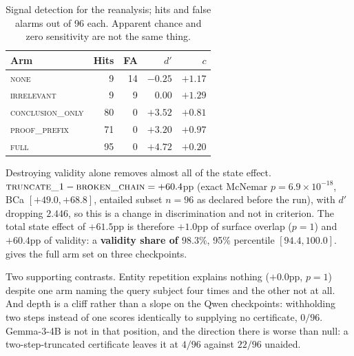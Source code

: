 \documentclass[10pt,twocolumn]{article}
\begin{document}
\begin{table}[tb]
\centering\footnotesize
\caption{Signal detection for the reanalysis; hits and false alarms out of 96
each. Apparent chance and zero
sensitivity are not the same thing.}
\label{tab:sdt}
\begin{tabular}{lrrrr}
\toprule
Arm & Hits & FA & $d'$ & $c$ \\
\midrule
\textsc{none} & 9 & 14 & $-0.25$ & $+1.17$ \\
\textsc{irrelevant}      &  9 &  9 & $\mathbf{0.00}$ & $+1.29$ \\
\textsc{conclusion\_only}& 80 &  0 & $+3.52$ & $+0.81$ \\
\textsc{proof\_prefix}   & 71 &  0 & $+3.20$ & $+0.97$ \\
\textsc{full}            & 95 &  0 & $+4.72$ & $+0.20$ \\
\bottomrule
\end{tabular}
\end{table}

Destroying validity alone removes almost all of the
state effect.
$\textsc{truncate\_1} - \textsc{broken\_chain} = +60.4$pp (exact McNemar
$p = 6.9\times10^{-18}$, BCa $[+49.0, +68.8]$, entailed subset $n = 96$ as
declared before the run), with $d'$ dropping $2.446$, so this is a change in
discrimination and not in criterion. The total state effect of $+61.5$pp is
therefore $+1.0$pp of surface overlap ($p = 1$) and $+60.4$pp of validity: a
\textbf{validity share of $98.3\%$}, 95\% percentile $[94.4, 100.0]$.
 gives the full arm set on three checkpoints.

Two supporting contrasts. Entity repetition explains nothing
($+0.0$pp, $p = 1$) despite one arm naming the query subject four times and the
other not at all. And depth is a cliff rather than a slope on the Qwen
checkpoints: withholding two steps instead of one scores identically to
supplying no certificate, $0/96$. Gemma-3-4B is not in that position, and the
direction there is worse than null: a two-step-truncated certificate leaves it
at $4/96$ against $22/96$ unaided.
\end{document}
